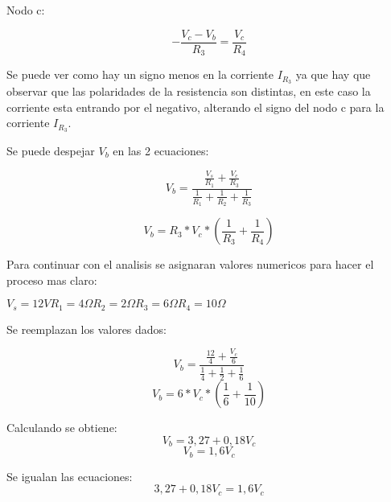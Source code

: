\begin{example}
        Nodo c:

        \begin{equation*}
        -\frac{V_c - V_b}{R_3}=\frac{V_c}{R_4}
        \end{equation*}

        Se puede ver como hay un signo menos en la corriente $I_R_3$ ya que hay que observar que las polaridades de la resistencia son distintas, en este caso la corriente esta entrando por el negativo, alterando el signo del nodo c para la corriente $I_R_3$.

        Se puede despejar $V_b$ en las 2 ecuaciones:

        \begin{equation*}
        V_b =\frac{\frac{V_s}{R_1}+\frac{V_c}{R_3}}{\frac{1}{R_1}+\frac{1}{R_2}+\frac{1}{R_3}}
        \end{equation*}

        \begin{equation*}
        V_b=R_3*V_c*(\frac{1}{R_3}+\frac{1}{R_4})
        \end{equation*}

        Para continuar con el analisis se asignaran valores numericos para hacer el proceso mas claro:

        \hspace{2 cm}$V_s=12 V$\hspace{1 cm}$R_1=4\Omega$\hspace{1 cm}$R_2=2 \Omega$\hspace{1 cm}$R_3=6 \Omega$\hspace{1 cm}$R_4=10 \Omega$

        Se reemplazan los valores dados:

        \begin{equation*}
        V_b=\frac{\frac{12}{4}+\frac{V_c}{6}}{\frac{1}{4}+\frac{1}{2}+\frac{1}{6}}
        \end{equation*}
        \begin{equation*}
        V_b=6*V_c*(\frac{1}{6}+\frac{1}{10})
        \end{equation*}

        Calculando se obtiene:
        \begin{equation*}
        V_b=3,27 +0,18V_c
        \end{equation*}
        \begin{equation*}
        V_b=1,6V_c
        \end{equation*}

        Se igualan las ecuaciones:
        \begin{equation*}
        3,27+0,18V_c=1,6V_c
        \end{equation*}


\end{example}
